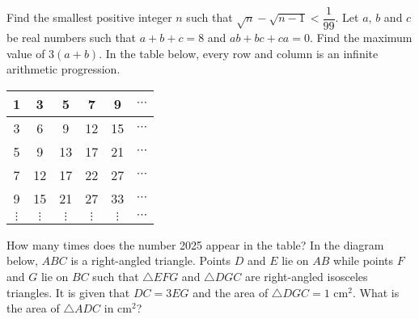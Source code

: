 \begin{enumerate}
    \begin{center}
    \end{center}
    \hyperrefitem[Q::2024-J-1-17] Find the smallest positive integer $n$ such that $\sqrt{n} - \sqrt{n - 1} < \dfrac1{99}$.
    \hyperrefitem[Q::2024-J-1-18] Let $a$, $b$ and $c$ be real numbers such that $a + b + c = 8$ and $ab + bc + ca = 0$. Find the maximum value of $3(a + b)$.
    \hyperrefitem[Q::2024-J-1-19] In the table below, every row and column is an infinite arithmetic progression.

    \begin{table}[H]
        \centering
        \begin{tabular}{|c|c|c|c|c|c|}
        \hline
        1 & 3 & 5 & 7 & 9 & $\cdots$ \\\hline
        3 & 6 & 9 & 12 & 15 & $\cdots$ \\\hline
        5 & 9 & 13 & 17 & 21 & $\cdots$ \\\hline
        7 & 12 & 17 & 22 & 27 & $\cdots$ \\\hline
        9 & 15 & 21 & 27 & 33 & $\cdots$ \\\hline
        $\vdots$ & $\vdots$ & $\vdots$ & $\vdots$ & $\vdots$ & $\cdots$\\\hline
        \end{tabular}
    \end{table}

    How many times does the number 2025 appear in the table?
    \hyperrefitem[Q::2024-J-1-20] In the diagram below, $ABC$ is a right-angled triangle. Points $D$ and $E$ lie on $AB$ while points $F$ and $G$ lie on $BC$ such that $\triangle EFG$ and $\triangle DGC$ are right-angled isosceles triangles. It is given that $DC = 3EG$ and the area of $\triangle DGC = 1$ cm$^2$. What is the area of $\triangle ADC$ in cm$^2$?


\end{enumerate}
